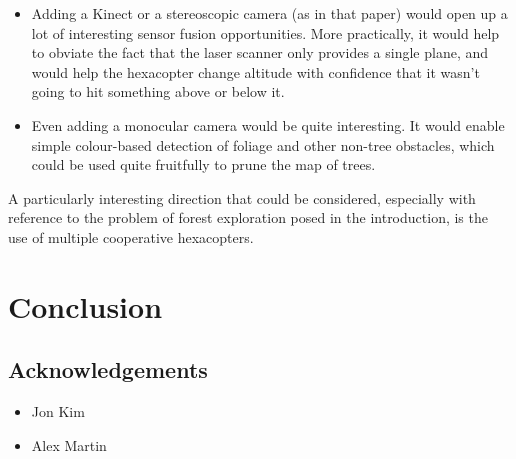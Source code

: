 \documentclass[12pt,oneside,a4paper]{book}
\begin{document}
\begin{itemize}
\item Adding a Kinect or a stereoscopic
camera (as in that paper) would open up a lot of interesting sensor
fusion opportunities. More practically, it would help to obviate the
fact that the laser scanner only provides a single plane, and would
help the hexacopter change altitude with confidence that it wasn't
going to hit something above or below it.
\item Even adding a monocular camera would be quite interesting. It
  would enable simple colour-based detection of foliage and other
  non-tree obstacles, which could be used quite fruitfully to prune
  the map of trees.
\end{itemize}

A particularly interesting direction that could be considered,
especially with reference to the problem of forest exploration posed
in the introduction, is the use of multiple cooperative
hexacopters.

\chapter{Conclusion}
\label{cha:conclusion}

\section{Acknowledgements}
\label{sec:acknowledgements}

\begin{itemize}
\item Jon Kim
\item Alex Martin
\end{itemize}


%

\backmatter


\end{document}
